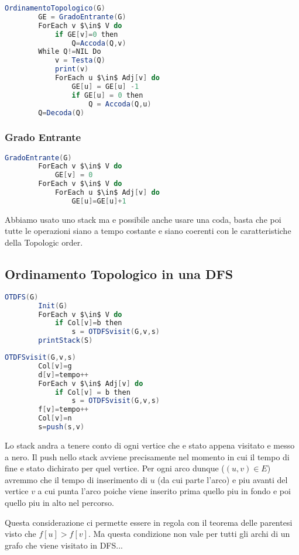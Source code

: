 \begin{lstlisting}[language=Java]
	OrdinamentoTopologico(G)
		GE = GradoEntrante(G)
		ForEach v $\in$ V do
			if GE[v]=0 then
				Q=Accoda(Q,v)
		While Q!=NIL Do
			v = Testa(Q)
			print(v)
			ForEach u $\in$ Adj[v] do 
				GE[u] = GE[u] -1
				if GE[u] = 0 then
					Q = Accoda(Q,u)
		Q=Decoda(Q)
\end{lstlisting}

\subsubsection{Grado Entrante}

\begin{lstlisting}[language=Java]
	GradoEntrante(G)
		ForEach v $\in$ V do
			GE[v] = 0
		ForEach v $\in$ V do
			ForEach u $\in$ Adj[v] do
				GE[u]=GE[u]+1
\end{lstlisting}

Abbiamo usato uno stack ma e possibile anche usare una coda, basta che poi tutte le operazioni siano a tempo costante e siano coerenti con le caratteristiche della Topologic order.

\subsection{Ordinamento Topologico in una DFS}
\begin{lstlisting}[language=Java]
	OTDFS(G)
		Init(G)
		ForEach v $\in$ V do
			if Col[v]=b then
				s = OTDFSvisit(G,v,s)
		printStack(S)
\end{lstlisting}

\begin{lstlisting}[language=Java]
	OTDFSvisit(G,v,s)
		Col[v]=g
		d[v]=tempo++
		ForEach v $\in$ Adj[v] do
			if Col[v] = b then
				s = OTDFSvisit(G,v,s)
		f[v]=tempo++
		Col[v]=n
		s=push(s,v)
\end{lstlisting}

Lo stack andra a tenere conto di ogni vertice che e stato appena visitato e messo a nero. Il push nello stack avviene precisamente nel momento in cui il tempo di fine e stato dichirato per quel vertice.
Per ogni arco dunque ($(u,v) \in E$) avremmo che il tempo di inserimento di $u$ (da cui parte l'arco) e piu avanti del vertice $v$ a cui punta l'arco poiche viene inserito prima quello piu in fondo e poi quello piu in alto nel percorso.

Questa considerazione ci permette essere in regola con il teorema delle parentesi visto che $f[u]>f[v]$. Ma questa condizione non vale per tutti gli archi di un grafo che viene visitato in DFS...


